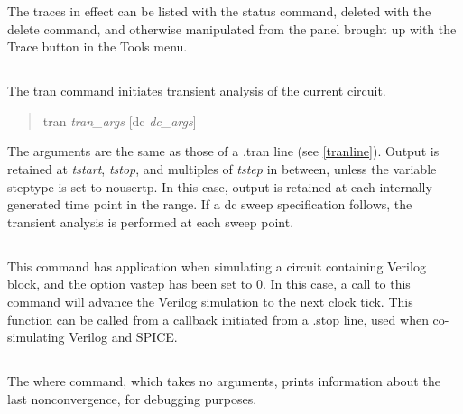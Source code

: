 The traces in effect can be listed with the {\cb status} command,
deleted with the {\cb delete} command, and otherwise manipulated from
the panel brought up with the {\cb Trace} button in the {\cb Tools}
menu.

\subsection{}


The {\cb tran} command initiates transient analysis of the current
circuit.
\begin{quote}\vt
tran {\it tran\_args} [dc {\it dc\_args\/}]
\end{quote}
The arguments are the same as those of a {\vt .tran} line (see
\ref{tranline}).  Output is retained at {\it tstart}, {\it tstop}, and
multiples of {\it tstep} in between, unless the variable {\et
steptype} is set to {\vt nousertp}.  In this case, output is retained
at each internally generated time point in the range.  If a dc sweep
specification follows, the transient analysis is performed at each
sweep point.

\subsection{}


This command has application when simulating a circuit containing
Verilog block, and the option {\et vastep} has been set to 0.  In this
case, a call to this command will advance the Verilog simulation to
the next clock tick.  This function can be called from a callback
initiated from a {\vt .stop} line, used when co-simulating Verilog and
SPICE.

\subsection{}


The {\cb where} command, which takes no arguments, prints information
about the last nonconvergence, for debugging purposes.



